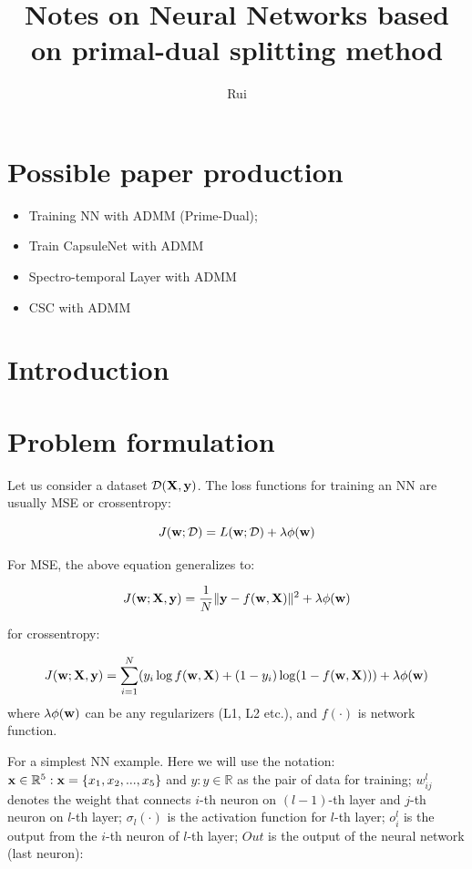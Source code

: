 \documentclass[11pt,a4paper]{article}
\title{Notes on Neural Networks based on primal-dual splitting method }
\author{Rui}
\begin{document}
\maketitle

\tableofcontents
\section{Possible paper production}
\begin{itemize}
	\item Training NN with ADMM (Prime-Dual); 
	\item Train CapsuleNet with ADMM
	\item Spectro-temporal Layer with ADMM
	\item CSC with ADMM
\end{itemize}
\section{Introduction}

\section{Problem formulation}

Let us consider a dataset $\mathcal{D} (\mathbf{X}, \mathbf{y})$. The loss functions for training an NN are usually MSE or crossentropy:

\begin{equation}
J(\mathbf{w}; \mathcal{D}) = L(\mathbf{w}; \mathcal{D}) + \lambda \phi (\mathbf{w})
\end{equation}

For MSE, the above equation generalizes to:

\begin{equation}
J(\mathbf{w}; \mathbf{X}, \mathbf{y}) = \frac{1}{N}\lVert\mathbf{y} - f(\mathbf{w}, \mathbf{X})\rVert^2 + \lambda \phi(\mathbf{w})
\end{equation}

for crossentropy:

\begin{equation}
J(\mathbf{w}; \mathbf{X}, \mathbf{y}) = \sum^N_{i=1}(y_i\log f(\mathbf{w},\mathbf{X}) + (1-y_i)\log (1-f(\mathbf{w}, \mathbf{X}))) + \lambda \phi(\mathbf{w})
\end{equation}
where $\lambda \phi(\mathbf{w})$ can be any regularizers (L1, L2 etc.), and $f(\cdot)$ is network function. 

For a simplest NN example. Here we will use the notation: $\mathbf{x}\in \mathbb{R}^5: \mathbf{x} = \{x_1, x_2, ..., x_5\}$ and $y: y\in \mathbb{R}$ as the pair of data for training; $w^l_{ij}$ denotes the weight that connects $i$-th neuron on $(l-1)$-th layer and $j$-th neuron on $l$-th layer; $\sigma_l(\cdot)$ is the activation function for $l$-th layer; $o^l_i$ is the output from the $i$-th neuron of $l$-th layer; $Out$ is the output of the neural network (last neuron): 
\end{document}
